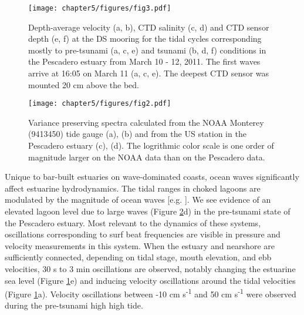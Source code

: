 
\begin{figure}
\texttt{[image: chapter5/figures/fig3.pdf]}

\protect\caption{Depth-average velocity (a, b), CTD salinity (c, d) and CTD sensor
depth (e, f) at the DS mooring for the tidal cycles corresponding
mostly to pre-tsunami (a, c, e) and tsunami (b, d, f) conditions in
the Pescadero estuary from March 10 - 12, 2011. The first waves arrive
at 16:05 on March 11 (a, c, e). The deepest CTD sensor was mounted
20 cm above the bed. \label{fig:Station-DS-CTD_stack}}
\end{figure}



\begin{figure}
\centering
\textsf{\texttt{[image: chapter5/figures/fig2.pdf]}}

\protect\caption{Variance preserving spectra calculated from the NOAA Monterey (9413450)
tide gauge (a), (b) and from the US station in the Pescadero estuary
(c), (d).  The logrithmic color scale is one order of magnitude larger
on the NOAA data than on the Pescadero data.\label{fig:Pescadero-stacked-variance_presreving_spectra}}
\end{figure}

Unique to bar-built estuaries on wave-dominated coasts, ocean waves
significantly affect estuarine hydrodynamics. The tidal ranges in
choked lagoons are modulated by the magnitude of ocean waves {[}e.g.
\cite{malhadas_effect_2009}{]}. We see evidence of an elevated
lagoon level due to large waves (Figure \ref{fig:Pescadero-stacked-variance_presreving_spectra}d)
in the pre-tsunami state of the Pescadero estuary. Most relevant to
the dynamics of these systems, oscillations corresponding to surf
beat frequencies are visible in pressure and velocity measurements
in this system. When the estuary and nearshore are sufficiently connected,
depending on tidal stage, mouth elevation, and ebb velocities, 30
s to 3 min oscillations are observed, notably changing the estuarine
sea level (Figure \ref{fig:Station-DS-CTD_stack}e) and inducing velocity
oscillations around the tidal velocities (Figure \ref{fig:Station-DS-CTD_stack}a).
Velocity oscillations between -10 cm s\textsuperscript{-1} and 50
cm s\textsuperscript{-1} were observed during the pre-tsunami high
high tide. 

